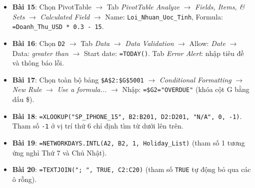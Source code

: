 \begin{dapanbox}
\begin{itemize}
    \item \textbf{Bài 15}: Chọn PivotTable $\rightarrow$ Tab \textit{PivotTable Analyze} $\rightarrow$ \textit{Fields, Items, \& Sets} $\rightarrow$ \textit{Calculated Field} $\rightarrow$ Name: \texttt{Loi\_Nhuan\_Uoc\_Tinh}, Formula: \texttt{=Doanh\_Thu\_USD * 0.3 - 15}.
    \item \textbf{Bài 16}: Chọn \texttt{D2} $\rightarrow$ Tab \textit{Data} $\rightarrow$ \textit{Data Validation} $\rightarrow$ Allow: \textit{Date} $\rightarrow$ Data: \textit{greater than} $\rightarrow$ Start date: \texttt{=TODAY()}. Tab \textit{Error Alert}: nhập tiêu đề và thông báo lỗi.
    \item \textbf{Bài 17}: Chọn toàn bộ bảng \texttt{\$A\$2:\$G\$5001} $\rightarrow$ \textit{Conditional Formatting} $\rightarrow$ \textit{New Rule} $\rightarrow$ \textit{Use a formula...} $\rightarrow$ Nhập: \texttt{=\$G2="OVERDUE"} (khóa cột G bằng dấu \$).
    \item \textbf{Bài 18}: \texttt{=XLOOKUP("SP\_IPHONE\_15", B2:B201, D2:D201, "N/A", 0, -1)}. Tham số \texttt{-1} ở vị trí thứ 6 chỉ định tìm từ dưới lên trên.
    \item \textbf{Bài 19}: \texttt{=NETWORKDAYS.INTL(A2, B2, 1, Holiday\_List)} (tham số 1 tương ứng nghỉ Thứ 7 và Chủ Nhật).
    \item \textbf{Bài 20}: \texttt{=TEXTJOIN("; ", TRUE, C2:C20)} (tham số \texttt{TRUE} tự động bỏ qua các ô rỗng).
\end{itemize}
\end{dapanbox}
